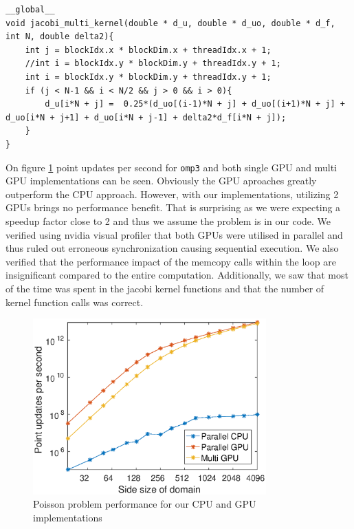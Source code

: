 \begin{lstlisting}
__global__ 
void jacobi_multi_kernel(double * d_u, double * d_uo, double * d_f, int N, double delta2){
	int j = blockIdx.x * blockDim.x + threadIdx.x + 1;
	//int i = blockIdx.y * blockDim.y + threadIdx.y + 1;
	int i = blockIdx.y * blockDim.y + threadIdx.y + 1;
	if (j < N-1 && i < N/2 && j > 0 && i > 0){
		d_u[i*N + j] =  0.25*(d_uo[(i-1)*N + j] + d_uo[(i+1)*N + j] + d_uo[i*N + j+1] + d_uo[i*N + j-1] + delta2*d_f[i*N + j]);
	}	
}
\end{lstlisting}

On figure \ref{fig:poisson_mul} point updates per second for \texttt{omp3} and both single GPU and multi GPU implementations can be seen. Obviously the GPU aproaches greatly outperform the CPU approach. However, with our implementations, utilizing 2 GPUs brings no performance benefit. That is surprising as we were expecting a speedup factor close to 2 and thus we assume the problem is in our code. We verified using nvidia visual profiler that both GPUs were utilised in parallel and thus ruled out erroneous synchronization causing sequential execution. We also verified that the performance impact of the memcopy calls within the loop are insignificant compared to the entire computation. Additionally,  we saw that most of the time was spent in the jacobi kernel functions and that the number of kernel function calls was correct. 


\begin{figure}
\centering
\includegraphics[width = 0.8\textwidth]{fig/multigpu.eps}
\caption{Poisson problem performance for our CPU and GPU implementations}
\label{fig:poisson_mul}
\end{figure}
